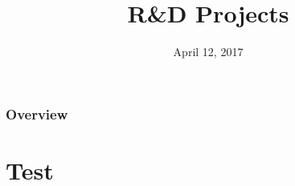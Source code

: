 \documentclass{beamer}
\title[R\&D Projects]{R\&D Projects} %
\date{April 12, 2017} %
\begin{document}
\begin{frame}
\titlepage %
\end{frame}

\begin{frame}
\frametitle{Overview} %
\tableofcontents %
\end{frame}



\section{Test}
\end{document}
